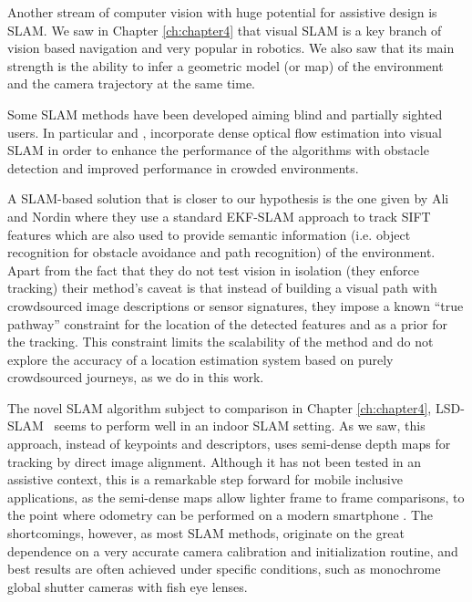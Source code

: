 
Another stream of computer vision with huge potential for assistive design is SLAM. We saw in Chapter \ref{ch:chapter4} that visual SLAM is a key branch of vision based navigation and very popular in robotics. We also saw that its main strength is the ability to infer a geometric model (or map) of the environment and the camera trajectory at the same time. 

Some SLAM methods have been developed aiming blind and partially sighted users. In particular \cite{alcantarilla2010visual} and \cite{alcantarilla2012combining}, incorporate dense optical flow estimation into visual SLAM in order to enhance the performance of the algorithms with obstacle detection and improved performance in crowded environments.



A SLAM-based solution that is closer to our hypothesis is the one given by Ali and Nordin \cite{ali2010indoor} where they use a standard EKF-SLAM approach to track SIFT features which are also used to provide semantic information (i.e. object recognition for obstacle avoidance and path recognition) of the environment. Apart from the fact that they do not test vision in isolation (they enforce tracking) their method's caveat is that instead of building a visual path with crowdsourced image descriptions or sensor signatures, they impose a known ``true pathway'' constraint for the location of the detected features and as a prior for the tracking. This constraint limits the scalability of the method and do not explore the accuracy of a location estimation system based on purely crowdsourced journeys, as we do in this work.

The novel SLAM algorithm subject to comparison in Chapter \ref{ch:chapter4}, LSD-SLAM~\citep{engel14eccv} seems to perform well in an indoor SLAM setting. As we saw, this approach, instead of keypoints and descriptors, uses semi-dense depth maps for tracking by direct image alignment. Although it has not been tested in an assistive context, this is a remarkable step forward for mobile inclusive applications, as the semi-dense maps allow lighter frame to frame comparisons, to the point where odometry can be performed on a modern smartphone \citep{schoeps14ismar}. The shortcomings, however, as most SLAM methods, originate on the great dependence on a very accurate camera calibration and initialization routine, and best results are often achieved under specific conditions, such as monochrome global shutter cameras with fish eye lenses.

